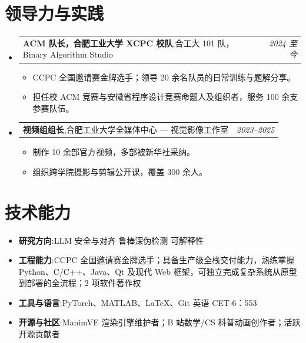 \documentclass[a4paper,10pt]{article}
\makeatletter
\newcommand{\resumeItem}[2]{
  \item{\textbf{#1}{:\hspace{0.5mm}#2 \vspace{-0.5mm}}}
}
\newcommand{\resumePOR}[3]{
\vspace{0.5mm}\item
    \begin{tabular*}{0.97\textwidth}[t]{l@{\extracolsep{\fill}}r}
        \textbf{#1},\hspace{0.3mm}#2 & \textit{\small{#3}}
    \end{tabular*}
    \vspace{-2mm}
}
\newcommand{\resumeSubItem}[2]{\resumeItem{#1}{#2}\vspace{-4pt}}
\newcommand{\resumeSubHeadingListStart}{\begin{itemize}[leftmargin=*,labelsep=0mm]}
\newcommand{\resumeHeadingSkillStart}{\begin{itemize}[leftmargin=*,itemsep=1.7mm, rightmargin=2ex]}
\newcommand{\resumeItemListStart}{\begin{justify}\begin{itemize}[leftmargin=3ex, rightmargin=2ex, noitemsep,labelsep=1.2mm,itemsep=0mm]\small}
\newcommand{\resumeSubHeadingListEnd}{\end{itemize}\vspace{2mm}}
\newcommand{\resumeHeadingSkillEnd}{\end{itemize}\vspace{-2mm}}
\newcommand{\resumeItemListEnd}{\end{itemize}\end{justify}\vspace{-2mm}}
\makeatother
\begin{document}
\section{领导力与实践}
\vspace{-0.4mm}
\resumeSubHeadingListStart
    \resumePOR{ACM 队长，合肥工业大学 XCPC 校队}
        {合工大 101 队，Binary Algorithm Studio}
        {2024 至今}
    \resumeItemListStart
        \item {CCPC 全国邀请赛金牌选手；领导 20 余名队员的日常训练与题解分享。}
        \item {担任校 ACM 竞赛与安徽省程序设计竞赛命题人及组织者，服务 100 余支参赛队伍。}
    \resumeItemListEnd
    \resumePOR{视频组组长}
        {合肥工业大学全媒体中心 --- 视觉影像工作室}
        {2023--2025}
    \resumeItemListStart
        \item {制作 10 余部官方视频，多部被新华社采纳。}
        \item {组织跨学院摄影与剪辑公开课，覆盖 300 余人。}
    \resumeItemListEnd
\resumeSubHeadingListEnd
\vspace{-4mm}


\section{技术能力}
\vspace{-0.4mm}
\resumeHeadingSkillStart
  \resumeSubItem{研究方向}
    {LLM 安全与对齐 \textbar{} 鲁棒深伪检测 \textbar{} 可解释性}
  \resumeSubItem{工程能力}
    {CCPC 全国邀请赛金牌选手；具备生产级全栈交付能力，熟练掌握 Python、C/C++、Java、Qt 及现代 Web 框架，可独立完成复杂系统从原型到部署的全流程；2 项软件著作权}
  \resumeSubItem{工具与语言}
    {PyTorch、MATLAB、\LaTeX、Git \textbar{} 英语 CET-6：553}
  \resumeSubItem{开源与社区}
    {ManimVE 渲染引擎维护者；B 站数学/CS 科普动画创作者；活跃开源贡献者}
\resumeHeadingSkillEnd
\vspace{-4mm}

\end{document}
